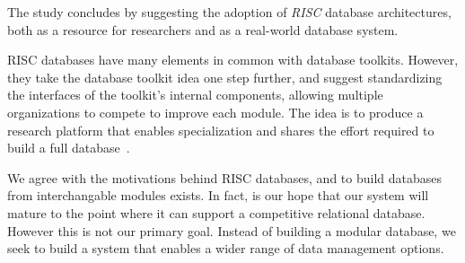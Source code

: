 \documentclass[letterpaper,twocolumn,10pt]{article}
\begin{document}

The study concludes 
by suggesting the adoption of {\em RISC} database architectures, both as a resource for researchers and as a 
real-world database system.

RISC databases have many elements in common with
database toolkits.  However, they take the database toolkit idea one
step further, and suggest standardizing the interfaces of the
toolkit's internal components, allowing multiple organizations to
compete to improve each module.  The idea is to produce a research
platform that enables specialization and shares the effort required to build a full database~\cite{riscDB}.

We agree with the motivations behind RISC databases, and to build 
databases from interchangable modules exists.  In fact, is our hope
that our system will mature to the point where it can support 
a competitive relational database.  However this is
not our primary goal.  
Instead of building a modular database, we seek
to build a system that enables a wider range of data management options.



\end{document}
